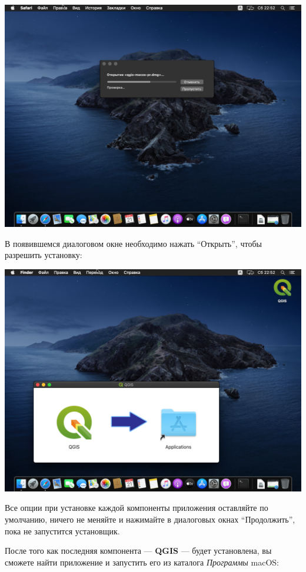 \documentclass[
  12pt,
]{book}
\begin{document}
\includegraphics{images/installation_instruction_mac/mac03.png}

В появившемся диалоговом окне необходимо нажать ``Открыть'', чтобы разрешить установку:

\includegraphics{images/installation_instruction_mac/mac04.png}

Все опции при установке каждой компоненты приложения оставляйте по умолчанию, ничего не меняйте и нажимайте в диалоговых окнах ``Продолжить'', пока не запустится установщик.

После того как последняя компонента --- \textbf{QGIS} --- будет установлена, вы сможете найти приложение и запустить его из каталога \emph{Программы} macOS:
\end{document}
